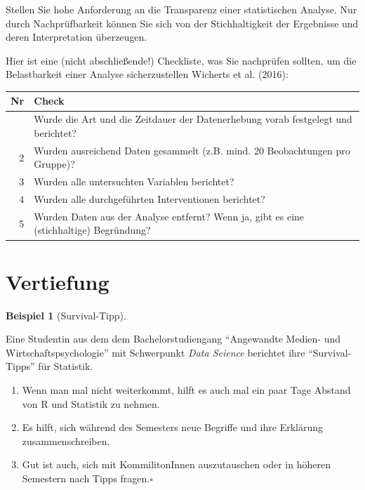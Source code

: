 \documentclass[
  a4paper,
]{scrbook}
\providecommand{\tightlist}{%
  \setlength{\itemsep}{0pt}\setlength{\parskip}{0pt}}\usepackage{longtable,booktabs,array}
\theoremstyle{definition}
\newtheorem{example}{Beispiel}[chapter]
\theoremstyle{definition}
\theoremstyle{definition}
\theoremstyle{remark}
\begin{document}
\label{callout-important}
Stellen Sie hohe Anforderung an die Transparenz einer statistischen
Analyse. Nur durch Nachprüfbarkeit können Sie sich von der
Stichhaltigkeit der Ergebnisse und deren Interpretation überzeugen.

Hier ist eine (nicht abschließende!) Checkliste, was Sie nachprüfen
sollten, um die Belastbarkeit einer Analyse sicherzustellen Wicherts et
al. (2016):

\begin{longtable*}{rl}
\toprule
Nr & Check \\ 
\midrule{} & Wurde die Art und die Zeitdauer der Datenerhebung vorab festgelegt und berichtet? \\ 
2 & Wurden ausreichend Daten gesammelt (z.B. mind. 20 Beobachtungen pro Gruppe)? \\ 
3 & Wurden alle untersuchten Variablen berichtet? \\ 
4 & Wurden alle durchgeführten Interventionen berichtet? \\ 
5 & Wurden Daten aus der Analyse entfernt? Wenn ja, gibt es eine (stichhaltige) Begründung? \\ 
\bottomrule
\end{longtable*}

\section{Vertiefung}\label{vertiefung-5}

\begin{example}[Survival-Tipp]\protect\hypertarget{exm-survival1}{}\label{exm-survival1}

Eine Studentin aus dem dem Bachelorstudiengang ``Angewandte Medien- und
Wirtschaftspsychologie'' mit Schwerpunkt \emph{Data Science} berichtet
ihre ``Survival-Tipps'' für Statistik.

\begin{enumerate}
\def\labelenumi{\arabic{enumi}.}
\tightlist
\item
  Wenn man mal nicht weiterkommt, hilft es auch mal ein paar Tage
  Abstand von R und Statistik zu nehmen.
\item
  Es hilft, sich während des Semesters neue Begriffe und ihre Erklärung
  zusammenschreiben.
\item
  Gut ist auch, sich mit KommilitonInnen auszutauschen oder in höheren
  Semestern nach Tipps fragen.\(\square\)
\end{enumerate}

\end{example}
\end{document}
